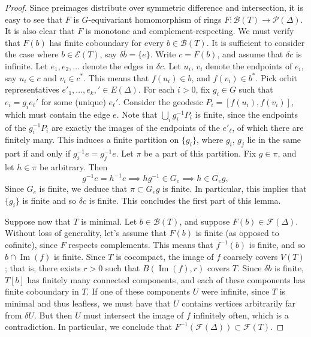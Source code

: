 \documentclass[11pt,a4paper]{amsart}
\theoremstyle{definition}
\newcommand{\br}{{\mathscr{B}}}
\begin{document}
\begin{proof}
    Since preimages distribute over symmetric difference and intersection, it is easy to see that $F$ is $G$-equivariant homomorphism of rings $F: \br(T) \to \mathscr P(\Delta)$. It is also clear that $F$ is monotone and complement-respecting. We must verify that $F(b)$ has finite coboundary for every $b \in \br(T)$. 
    It is sufficient to consider the case where $b \in \mathscr E(T)$, say $\delta b = \{e\}$. 
    Write $c = F(b)$, and assume that $\delta c$ is infinite. 
    Let $e_1, e_2, \ldots$ denote the edges in $\delta c$. Let $u_i$, $v_i$ denote the endpoints of $e_i$, say $u_i \in c$ and $v_i \in c^\ast$. 
    This means that $f(u_i) \in b$, and $f(v_i) \in b^\ast$. 
    Pick orbit representatives $e'_1, \ldots, e_k,' \in E(\Delta)$. 
    For each $i > 0$, fix $g_i \in G$ such that $e_i = g_ie_\ell'$ for some (unique) $e_\ell'$. Consider the geodesic $P_i = [f(u_i), f(v_i)]$, which must contain the edge $e$. Note that $\bigcup_i g_i^{-1}P_i$ is finite, since the endpoints of the $g_i^{-1}P_i$ are exactly the images of the endpoints of the $e'_\ell$, of which there are finitely many. 
    This induces a finite partition  on $\{g_i\}$, where $g_i$, $g_j$ lie in the same part if and only if $g_i^{-1} e = g_j^{-1} e$. Let $\pi$ be a part of this partition. Fix $g \in \pi$, and let $h \in \pi$ be arbitrary. Then 
    $$
    g^{-1}e = h^{-1}e \implies hg^{-1} \in G_e \implies h \in G_e g,
    $$ 
    Since $G_e$ is finite, we deduce that $\pi \subset G_eg$ is finite. In particular, this implies that $\{g_i\}$ is finite and so $\delta c$ is finite. This concludes the first part of this lemma.

    Suppose now that $T$ is minimal.
    Let $b \in \br(T)$, and suppose $F(b) \in \mathscr F(\Delta)$. Without loss of generality, let's assume that $F(b)$ is finite (as opposed to cofinite), since $F$ respects complements. 
    This means that $f^{-1}(b)$ is finite, and so $b \cap \operatorname{Im}(f)$ is finite. Since $T$ is cocompact, the image of $f$ coarsely covers $V(T)$; that is, there exists $r > 0$ such that $B(\operatorname{Im}(f),r)$ covers $T$. Since $\delta b$ is finite, $T[b]$ has finitely many connected components, and each of these components has finite coboundary in $T$. If one of these components $U$ were infinite, since $T$ is minimal and thus leafless, we must have that $U$ contains vertices arbitrarily far from $\delta U$. But then $U$ must intersect the image of $f$ infinitely often, which is a contradiction. In particular, we conclude that $F^{-1}(\mathscr F(\Delta)) \subset \mathscr F(T)$. 
\end{proof}
\end{document}
